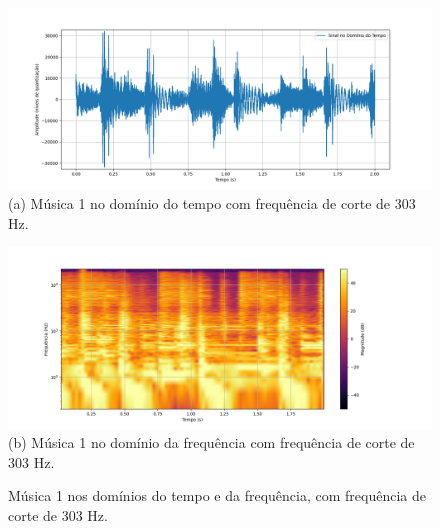 \begin{figure}[htpb]
    \centering
    \begin{minipage}[b]{0.7\textwidth}
        \centering
        \includegraphics[width=\textwidth]{figuras/fig83.png}
        \vspace{0.3cm} %
        (a) Música 1 no domínio do tempo com frequência de corte de 303 Hz.
    \end{minipage}
    \hspace{0.5cm} %

    \begin{minipage}[b]{0.75\textwidth}
        \centering
        \includegraphics[width=\textwidth]{figuras/fig84.png}
        \vspace{0.3cm} %
        (b) Música 1 no domínio da frequência com frequência de corte de 303 Hz.
    \end{minipage}

    \caption{Música 1 nos domínios do tempo e da frequência, com frequência de corte de 303 Hz.}
    \label{fig83}
\end{figure}

